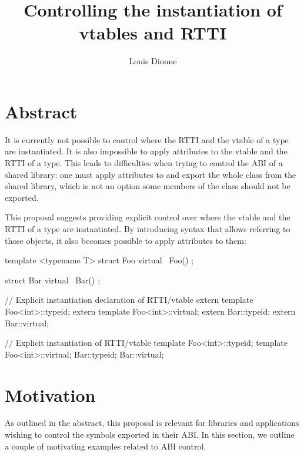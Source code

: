 \documentclass{wg21}
\title{Controlling the instantiation of vtables and RTTI}
\author{Louis Dionne}{ldionne@apple.com}
\begin{document}
\maketitle

\section{Abstract}
It is currently not possible to control where the RTTI and the vtable of a type
are instantiated. It is also impossible to apply attributes to the vtable and
the RTTI of a type. This leads to difficulties when trying to control the ABI
of a shared library: one must apply attributes to and export the whole class
from the shared library, which is not an option some members of the class
should not be exported.

This proposal suggests providing explicit control over where the vtable and
the RTTI of a type are instantiated. By introducing syntax that allows referring
to those objects, it also becomes possible to apply attributes to them:

\begin{cpp}
template <typename T>
struct Foo { virtual ~Foo() { } };

struct Bar { virtual ~Bar() { } };

// Explicit instantiation declaration of RTTI/vtable
extern template Foo<int>::typeid;
extern template Foo<int>::virtual;
extern Bar::typeid;
extern Bar::virtual;

// Explicit instantiation of RTTI/vtable
template Foo<int>::typeid;
template Foo<int>::virtual;
Bar::typeid;
Bar::virtual;
\end{cpp}


\section{Motivation}
As outlined in the abstract, this proposal is relevant for libraries and
applications wishing to control the symbols exported in their ABI. In this
section, we outline a couple of motivating examples related to ABI control.
\end{document}
